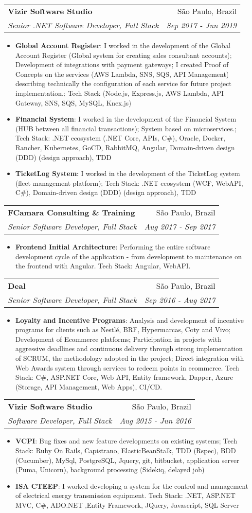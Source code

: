 \documentclass[letterpaper,11pt]{article}
\makeatletter
\newcommand{\resumeItem}[2]{
  \item\small{
    \textbf{#1}{: #2 \vspace{-2pt}}
  }
}
\newcommand{\resumeSubheading}[4]{
  \vspace{-1pt}\item
    \begin{tabular*}{0.97\textwidth}[t]{l@{\extracolsep{\fill}}r}
      \textbf{#1} & #2 \\
      \textit{\small#3} & \textit{\small #4} \\
    \end{tabular*}\vspace{-5pt}
}
\newcommand{\resumeItemListStart}{\begin{itemize}}
\newcommand{\resumeItemListEnd}{\end{itemize}\vspace{-5pt}}
\makeatother
\begin{document}
    \resumeSubheading
    {Vizir Software Studio}{São Paulo, Brazil}
    {Senior .NET Software Developer, Full Stack}{Sep 2017 - Jun 2019}
    \resumeItemListStart
      \resumeItem{Global Account Register}
        {I worked in the development of the Global Account Register (Global system for creating sales consultant accounts); 
        Development of integrations with payment gateways; I created Proof of Concepts on the services (AWS Lambda, SNS, SQS, API Management) describing technically the configuration of each service for future project implementation.;
        Tech Stack (Node.js, Express.js, AWS Lambda, API Gateway, SNS, SQS, MySQL, Knex.js)}
      \resumeItem{Financial System}
        {I worked in the development of the Financial System (HUB between all financial transactions);
        System based on microservices.;
        Tech Stack: .NET ecosystem (.NET Core, APIs, C\#), Oracle, Docker, Rancher, Kubernetes, GoCD, RabbitMQ, Angular, Domain-driven design (DDD) (design approach), TDD}
      \resumeItem{TicketLog System}
        {I worked in the development of the TicketLog system (fleet management platform);
        Tech Stack: .NET ecosystem (WCF, WebAPI, C\#), Domain-driven design (DDD) (design approach), TDD}
    \resumeItemListEnd

    \resumeSubheading
    {FCamara Consulting \& Training}{São Paulo, Brazil}
    {Senior Software Developer, Full Stack}{Aug 2017 - Sep 2017}
    \resumeItemListStart
      \resumeItem{Frontend Initial Architecture}
        {Performing the entire software development cycle of the application - from development to maintenance on the frontend with Angular. Tech Stack: Angular, WebAPI.}
    \resumeItemListEnd


    \resumeSubheading
    {Deal}{São Paulo, Brazil}
    {Senior Software Developer, Full Stack}{Sep 2016 - Aug 2017}
    \resumeItemListStart
      \resumeItem{Loyalty and Incentive Programs}
        {Analysis and development of incentive programs for clients such as Nestlé, BRF, Hypermarcas, Coty and Vivo;
        Development of Ecommerce platforms;
        Participation in projects with aggressive deadlines and continuous delivery through strong implementation of SCRUM, the methodology adopted in the project;
        Direct integration with Web Awards system through services to redeem points in ecommerce.
        Tech Stack: C\#, ASP.NET Core, Web API, Entity framework, Dapper, Azure (Storage, API Management, Web Apps), CI/CD.}
    \resumeItemListEnd

    \resumeSubheading
      {Vizir Software Studio}{São Paulo, Brazil}
      {Software Developer, Full Stack}{Aug 2015 - Jun 2016}
      \resumeItemListStart
        \resumeItem{VCPI}
          {Bug fixes and new feature developments on existing systems; Tech Stack: Ruby On Rails, Capistrano, ElasticBeanStalk, TDD
          (Rspec), BDD (Cucumber), MySql, PostgreSQL, Jquery, git, bitbucket, application server (Puma, Unicorn), background processing (Sidekiq, delayed job)}
        \resumeItem{ISA CTEEP}
          {I worked developing a system for the control and management of electrical energy transmission equipment. Tech Stack: .NET, ASP.NET MVC, C\#, ADO.NET ,Entity Framework, JQuery, Javascript, SQL Server}
      \resumeItemListEnd
      
\end{document}
